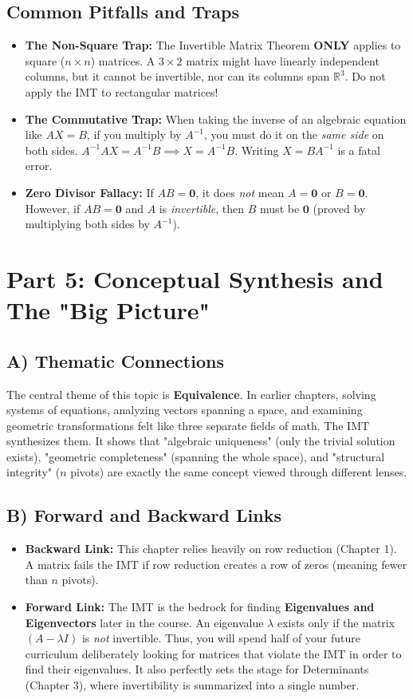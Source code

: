 \documentclass[12pt]{article}
\begin{document}
\subsection{Common Pitfalls and Traps}
\begin{itemize}
    \item \textbf{The Non-Square Trap:} The Invertible Matrix Theorem \textbf{ONLY} applies to square ($n \times n$) matrices. A $3 \times 2$ matrix might have linearly independent columns, but it cannot be invertible, nor can its columns span $\mathbb{R}^3$. Do not apply the IMT to rectangular matrices!
    \item \textbf{The Commutative Trap:} When taking the inverse of an algebraic equation like $AX = B$, if you multiply by $A^{-1}$, you must do it on the \emph{same side} on both sides. $A^{-1}AX = A^{-1}B \implies X = A^{-1}B$. Writing $X = BA^{-1}$ is a fatal error.
    \item \textbf{Zero Divisor Fallacy:} If $AB = \mathbf{0}$, it does \emph{not} mean $A = \mathbf{0}$ or $B = \mathbf{0}$. However, if $AB = \mathbf{0}$ and $A$ is \emph{invertible}, then $B$ must be $\mathbf{0}$ (proved by multiplying both sides by $A^{-1}$).
\end{itemize}


\section{Part 5: Conceptual Synthesis and The "Big Picture"}

\subsection{A) Thematic Connections}
The central theme of this topic is \textbf{Equivalence}. In earlier chapters, solving systems of equations, analyzing vectors spanning a space, and examining geometric transformations felt like three separate fields of math. The IMT synthesizes them. It shows that "algebraic uniqueness" (only the trivial solution exists), "geometric completeness" (spanning the whole space), and "structural integrity" ($n$ pivots) are exactly the same concept viewed through different lenses. 

\subsection{B) Forward and Backward Links}
\begin{itemize}
    \item \textbf{Backward Link:} This chapter relies heavily on row reduction (Chapter 1). A matrix fails the IMT if row reduction creates a row of zeros (meaning fewer than $n$ pivots).
    \item \textbf{Forward Link:} The IMT is the bedrock for finding \textbf{Eigenvalues and Eigenvectors} later in the course. An eigenvalue $\lambda$ exists only if the matrix $(A - \lambda I)$ is \emph{not} invertible. Thus, you will spend half of your future curriculum deliberately looking for matrices that violate the IMT in order to find their eigenvalues. It also perfectly sets the stage for Determinants (Chapter 3), where invertibility is summarized into a single number.
\end{itemize}
\end{document}
